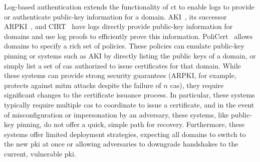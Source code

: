 Log-based authentication extends the functionality of \ac{ct} to enable logs to
provide or authenticate public-key information for a domain.
AKI~\cite{kim2013accountable}, its successor ARPKI~\cite{basin2014arpki}, and
CIRT~\cite{ryan2014enhanced} have logs directly provide public-key information
for domains and use log proofs to efficiently prove this information.
PoliCert~\cite{szalachowski2014policert} allows domains to specify a rich set of
policies. These policies can emulate public-key pinning or systems such as AKI
by directly listing the public keys of a domain, or simply list a set of
\acp{ca} authorized to issue certificates for that domain. While these systems
can provide strong security guarantees (ARPKI, for example, protects against
\ac{mitm} attacks despite the failure of $n$ \acp{ca}), they require significant
changes to the certificate issuance process. In particular, these systems
typically require multiple \acp{ca} to coordinate to issue a certificate, and in
the event of misconfiguration or impersonation by an adversary, these systems,
like public-key pinning, do not offer a quick, simple path for recovery.
Furthermore, these systems offer limited deployment strategies, expecting all
domains to switch to the new \ac{pki} at once or allowing adversaries to
downgrade handshakes to the current, vulnerable \ac{pki}.






